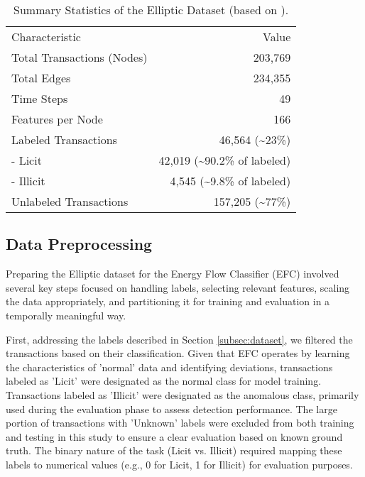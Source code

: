 \documentclass[12pt]{article}
\begin{document}
\begin{table}[htbp]
  \centering
  \caption{Summary Statistics of the Elliptic Dataset (based on \cite{weber2019antimoneylaunderingbitcoinexperimenting}).}
  \label{tab:dataset_summary}
  \begin{tabular}{lr}
    \hline
    Characteristic        & Value \\
    Total Transactions (Nodes) & 203,769 \\
    Total Edges           & 234,355 \\
    Time Steps            & 49 \\
    Features per Node     & 166 \\
    Labeled Transactions  & 46,564 (\textasciitilde23\%) \\
    \quad - Licit         & 42,019 (\textasciitilde90.2\% of labeled) \\
    \quad - Illicit       & 4,545 (\textasciitilde9.8\% of labeled) \\
    Unlabeled Transactions & 157,205 (\textasciitilde77\%) \\
  \end{tabular}
\end{table}

\subsection{Data Preprocessing} \label{subsec:preprocessing}

Preparing the Elliptic dataset for the Energy Flow Classifier (EFC) involved several key steps focused on handling labels,
selecting relevant features, scaling the data appropriately, and partitioning it for training and evaluation in a temporally
meaningful way.

First, addressing the labels described in Section \ref{subsec:dataset}, we filtered the transactions based on their
classification. Given that EFC operates by learning the characteristics of 'normal' data and identifying deviations,
transactions labeled as 'Licit' were designated as the normal class for model training. Transactions labeled as 'Illicit'
were designated as the anomalous class, primarily used during the evaluation phase to assess detection performance. The
large portion of transactions with 'Unknown' labels were excluded from both training and testing in this study to ensure
a clear evaluation based on known ground truth. The binary nature of the task (Licit vs. Illicit) required mapping these
labels to numerical values (e.g., 0 for Licit, 1 for Illicit) for evaluation purposes.
\end{document}
